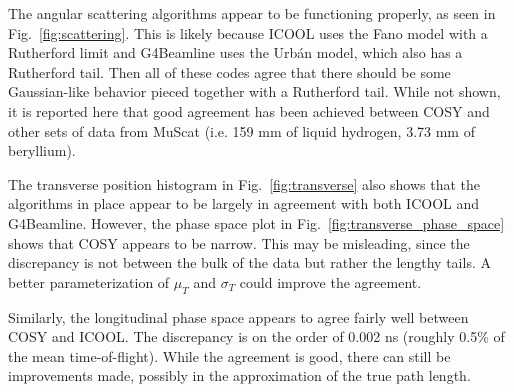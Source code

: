 \documentclass{jacow}
\begin{document}
The angular scattering algorithms appear to be functioning properly, as seen in Fig.~\ref{fig:scattering}. This is likely because ICOOL uses the Fano model with a Rutherford limit and G4Beamline uses the Urb\'{a}n model, which also has a Rutherford tail. Then all of these codes agree that there should be some Gaussian-like behavior pieced together with a Rutherford tail.
While not shown, it is reported here that good agreement has been achieved between COSY and other sets of data from MuScat \cite{Muscat} (i.e. 159 mm of liquid hydrogen, 3.73 mm of beryllium).

The transverse position histogram in Fig.~\ref{fig:transverse} also shows that the algorithms in place appear to be largely in agreement with both ICOOL and G4Beamline. However, the phase space plot in Fig.~\ref{fig:transverse_phase_space} shows that COSY appears to be narrow. This may be misleading, since the discrepancy is not between the bulk of the data but rather the lengthy tails.  A better parameterization of $\mu_T$ and $\sigma_T$ could improve the agreement.

Similarly, the longitudinal phase space appears to agree fairly well between COSY and ICOOL. The discrepancy is on the order of 0.002 ns (roughly 0.5\% of the mean time-of-flight). While the agreement is good, there can still be improvements made, possibly in the approximation of the true path length.
\end{document}
